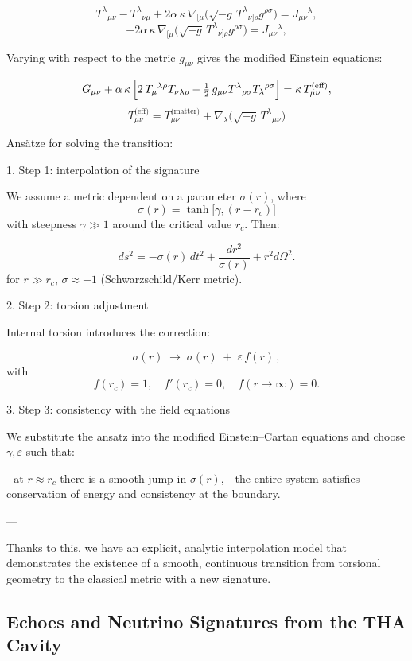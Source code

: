 \documentclass{article}
\begin{document}
\[
T^{\lambda}{}_{\mu\nu} - T^{\lambda}{}_{\nu\mu}
+ 2\alpha\,\kappa\,\nabla_{[\mu}\bigl(\sqrt{-g}\,T^{\lambda}{}_{\nu]\rho}g^{\rho\sigma}\bigr) = J_{\mu\nu}{}^\lambda,
\]
\[ 
+ 2\alpha\,\kappa\,\nabla_{[\mu}\bigl(\sqrt{-g}\,T^{\lambda}{}_{\nu]\rho}g^{\rho\sigma}\bigr) = J_{\mu\nu}{}^\lambda,
\]

Varying with respect to the metric $g_{\mu\nu}$ gives the modified Einstein equations:

\[
G_{\mu\nu} + \alpha\,\kappa\,\Bigl[2\,T_{\mu}{}^{\lambda\rho}T_{\nu\lambda\rho}
- \tfrac12\,g_{\mu\nu}T^{\lambda}{}_{\rho\sigma}T_{\lambda}{}^{\rho\sigma}\Bigr]
= \kappa\,T_{\mu\nu}^{\text{(eff)}},
\]
\[
T_{\mu\nu}^{\text{(eff)}}
= T_{\mu\nu}^{\text{(matter)}} 
+ \nabla_\lambda\bigl(\sqrt{-g}\,T^\lambda{}_{\mu\nu}\bigr)
\]

Ansätze for solving the transition:

1. Step 1: interpolation of the signature

We assume a metric dependent on a parameter $\sigma(r)$, where
$$\sigma(r) = \tanh\!\bigl[\gamma,(r-r_c)\bigr]$$
with steepness $\gamma\gg1$ around the critical value $r_c$. Then:

\[ 
ds^2 = -\sigma(r)\,dt^2 + \frac{dr^2}{\sigma(r)} + r^2 d\Omega^2.
\]
for $r\gg r_c$, $\sigma\approx +1$ (Schwarzschild/Kerr metric).

2. Step 2: torsion adjustment

Internal torsion introduces the correction:

\[
\sigma(r) \;\to\; \sigma(r)\;+\;\varepsilon\,f(r)\,,
\]
with
$$f(r_c)=1,\quad f'(r_c)=0,\quad f(r\to\infty)=0.$$

3. Step 3: consistency with the field equations

We substitute the ansatz into the modified Einstein–Cartan equations and choose $\gamma,\varepsilon$ such that:

- at $r\approx r_c$ there is a smooth jump in $\sigma(r)$,  
- the entire system satisfies conservation of energy and consistency at the boundary.

---

Thanks to this, we have an explicit, analytic interpolation model that demonstrates the existence of a smooth, continuous transition from torsional geometry to the classical metric with a new signature.


\subsection{Echoes and Neutrino Signatures from the THA Cavity}
\label{sec:THF-observables}
\end{document}
